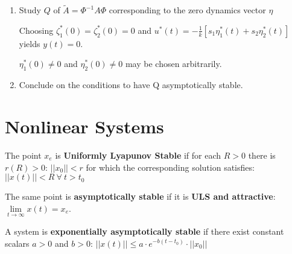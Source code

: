 \documentclass[10pt,a4paper]{scrartcl}
\begin{document}
\begin{multicols*}{3}
\begin{enumerate}[leftmargin=*]


\item Study $Q$ of $\tilde{A}=\Phi^{-1}A\Phi$ corresponding to the zero dynamics vector $\eta$

Choosing $\zeta_1^\ast(0)=\zeta_2^\ast(0)=0$ and $u^\ast(t)=-\frac{1}{k}[s_1\eta_1^\ast(t)+s_2\eta_2^\ast(t)]$ yields $y(t)=0$.

$\eta_1^\ast(0)\neq 0$ and $\eta_2^\ast(0)\neq 0$ may be chosen arbitrarily.


\item Conclude on the conditions to have Q asymptotically stable.
\end{enumerate}

\vfill

\null

\columnbreak

\section{Nonlinear Systems}



\finn

The point $x_e$ is \textbf{Uniformly Lyapunov Stable} if for each $R>0$ there is $r(R)>0$: $||x_0||<r$ for which the corresponding solution satisfies: $||x(t)||<R\ \forall\ t>t_0$

\finn

The same point is \textbf{asymptotically stable} if it is \textbf{ULS and attractive}: $\lim\limits_{t\rightarrow\infty} x(t) = x_e$.

\finn

A system is \textbf{exponentially asymptotically stable} if there exist constant scalars $a>0$ and $b>0$: $||x(t)||\leq a\cdot e^{-b(t-t_0)}\cdot||x_0||$


\end{multicols*}
\end{document}
